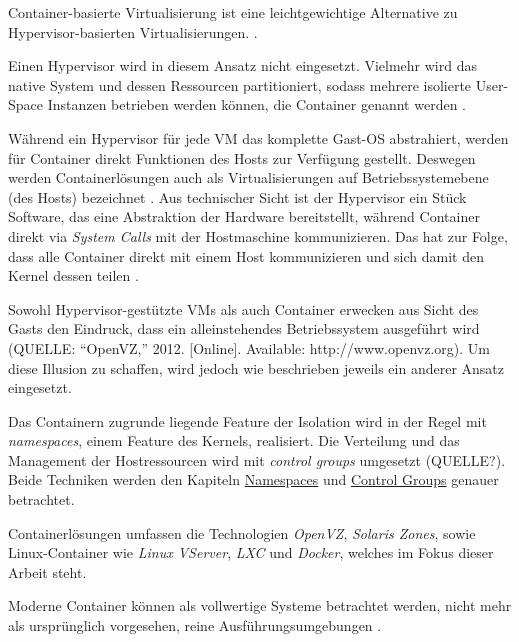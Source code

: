 \documentclass[11pt,a4paper,oneside]{report}
\begin{document}
      Container-basierte Virtualisierung ist eine leichtgewichtige Alternative zu Hypervisor-basierten Virtualisierungen. \cite[S.2]{containerVirtPerformance}.

      Einen Hypervisor wird in diesem Ansatz nicht eingesetzt. Vielmehr wird das native System und dessen Ressourcen partitioniert, sodass mehrere isolierte User-Space Instanzen betrieben werden können, die Container genannt werden \cite[S.2]{containerVirtPerformance} .

      Während ein Hypervisor für jede VM das komplette Gast-OS abstrahiert, werden für Container direkt Funktionen des Hosts zur Verfügung gestellt. Deswegen werden Containerlösungen auch als Virtualisierungen auf Betriebssystemebene (des Hosts) bezeichnet \cite[S.6]{dockerBook}\cite[S.2]{containerVirtPerformance}. Aus technischer Sicht ist der Hypervisor ein Stück Software, das eine Abstraktion der Hardware bereitstellt, während Container direkt via \emph{System Calls} mit der Hostmaschine kommunizieren. Das hat zur Folge, dass alle Container direkt mit einem Host kommunizieren und sich damit den Kernel dessen teilen \cite[S.2]{containerVirtPerformance}.

      Sowohl Hypervisor-gestützte VMs als auch Container erwecken aus Sicht des Gasts den Eindruck, dass ein alleinstehendes Betriebssystem ausgeführt wird (QUELLE: “OpenVZ,” 2012. [Online]. Available: http://www.openvz.org). Um diese Illusion zu schaffen, wird jedoch wie beschrieben jeweils ein anderer Ansatz eingesetzt.

      Das Containern zugrunde liegende Feature der Isolation wird in der Regel mit \emph{namespaces}, einem Feature des Kernels, realisiert. Die Verteilung und das Management der Hostressourcen wird mit \emph{control groups} umgesetzt (QUELLE?). Beide Techniken werden den Kapiteln \hyperref[secNamespaces]{\glqq{}Namespaces\grqq{}} und \hyperref[secCgroups]{\glqq{}Control Groups\grqq{}} genauer betrachtet.


      Containerlösungen umfassen die Technologien \emph{OpenVZ}, \emph{Solaris Zones}, sowie Linux-Container wie \emph{Linux VServer}, \emph{LXC} \cite[S.7]{dockerBook}\cite[S.1]{containerVirtPerformance} und \emph{Docker}, welches im Fokus dieser Arbeit steht.

      Moderne Container können als vollwertige Systeme betrachtet werden, nicht mehr als ursprünglich vorgesehen, reine Ausführungsumgebungen \cite[S.7]{dockerBook}.
\end{document}
